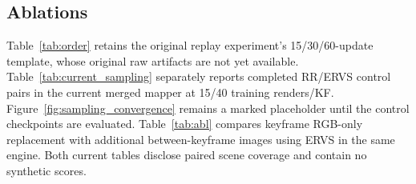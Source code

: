 



\subsection{Ablations}
\label{ssec:abl}

Table~\ref{tab:order} retains the original replay experiment's
15/30/60-update template, whose original raw artifacts are not yet available.
Table~\ref{tab:current_sampling} separately reports completed RR/ERVS control
pairs in the current merged mapper at 15/40 training renders/KF.
Figure~\ref{fig:sampling_convergence} remains a marked placeholder until the
control checkpoints are evaluated.
Table~\ref{tab:abl} compares keyframe RGB-only replacement with additional
between-keyframe images using ERVS in the same engine.
Both current tables disclose paired scene coverage and contain no synthetic scores.




